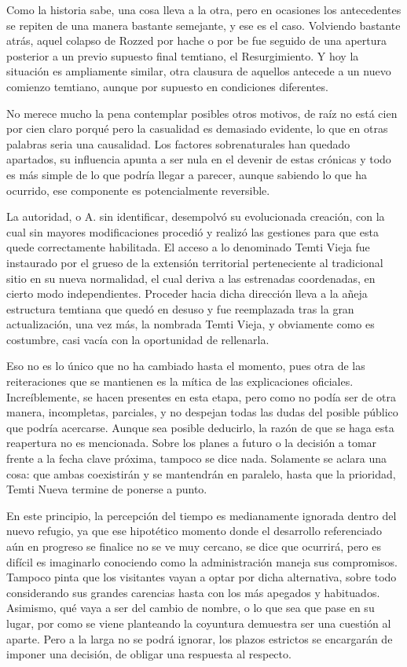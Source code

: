 \documentclass[
  spanish,
]{book}
\begin{document}
Como la historia sabe, una cosa lleva a la otra, pero en ocasiones los antecedentes se repiten de una manera bastante semejante, y ese es el caso. Volviendo bastante atrás, aquel colapso de Rozzed por hache o por be fue seguido de una apertura posterior a un previo supuesto final temtiano, el Resurgimiento. Y hoy la situación es ampliamente similar, otra clausura de aquellos antecede a un nuevo comienzo temtiano, aunque por supuesto en condiciones diferentes.

No merece mucho la pena contemplar posibles otros motivos, de raíz no está cien por cien claro porqué pero la casualidad es demasiado evidente, lo que en otras palabras seria una causalidad. Los factores sobrenaturales han quedado apartados, su influencia apunta a ser nula en el devenir de estas crónicas y todo es más simple de lo que podría llegar a parecer, aunque sabiendo lo que ha ocurrido, ese componente es potencialmente reversible.

La autoridad, o A. sin identificar, desempolvó su evolucionada creación, con la cual sin mayores modificaciones procedió y realizó las gestiones para que esta quede correctamente habilitada. El acceso a lo denominado Temti Vieja fue instaurado por el grueso de la extensión territorial perteneciente al tradicional sitio en su nueva normalidad, el cual deriva a las estrenadas coordenadas, en cierto modo independientes. Proceder hacia dicha dirección lleva a la añeja estructura temtiana que quedó en desuso y fue reemplazada tras la gran actualización, una vez más, la nombrada Temti Vieja, y obviamente como es costumbre, casi vacía con la oportunidad de rellenarla.

Eso no es lo único que no ha cambiado hasta el momento, pues otra de las reiteraciones que se mantienen es la mítica de las explicaciones oficiales. Increíblemente, se hacen presentes en esta etapa, pero como no podía ser de otra manera, incompletas, parciales, y no despejan todas las dudas del posible público que podría acercarse. Aunque sea posible deducirlo, la razón de que se haga esta reapertura no es mencionada. Sobre los planes a futuro o la decisión a tomar frente a la fecha clave próxima, tampoco se dice nada. Solamente se aclara una cosa: que ambas coexistirán y se mantendrán en paralelo, hasta que la prioridad, Temti Nueva termine de ponerse a punto.

En este principio, la percepción del tiempo es medianamente ignorada dentro del nuevo refugio, ya que ese hipotético momento donde el desarrollo referenciado aún en progreso se finalice no se ve muy cercano, se dice que ocurrirá, pero es difícil es imaginarlo conociendo como la administración maneja sus compromisos. Tampoco pinta que los visitantes vayan a optar por dicha alternativa, sobre todo considerando sus grandes carencias hasta con los más apegados y habituados. Asimismo, qué vaya a ser del cambio de nombre, o lo que sea que pase en su lugar, por como se viene planteando la coyuntura demuestra ser una cuestión al aparte. Pero a la larga no se podrá ignorar, los plazos estrictos se encargarán de imponer una decisión, de obligar una respuesta al respecto.
\end{document}
